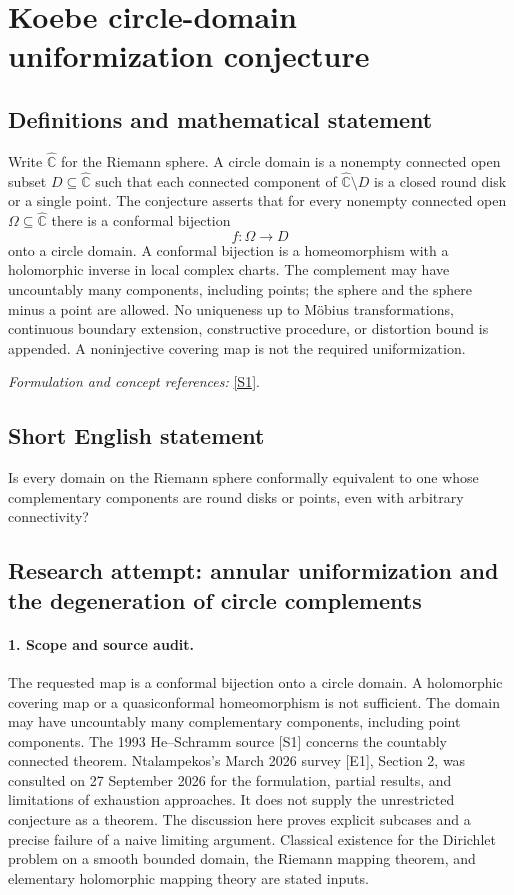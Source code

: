 \documentclass[11pt]{article}
\begin{document}
\section*{\texorpdfstring{Koebe circle-domain uniformization conjecture}{Koebe circle-domain uniformization conjecture}}\label{344}
\subsection{Definitions and mathematical statement}
Write $\widehat{{\mathbb{C}}}$ for the Riemann sphere. A circle domain is a nonempty connected open subset $D\subseteq\widehat{{\mathbb{C}}}$ such that each connected component of $\widehat{{\mathbb{C}}}\setminus D$ is a closed round disk or a single point. The conjecture asserts that for every nonempty connected open $\Omega\subseteq\widehat{{\mathbb{C}}}$ there is a conformal bijection
\[
 f:\Omega\longrightarrow D
\]
onto a circle domain. A conformal bijection is a homeomorphism with a holomorphic inverse in local complex charts. The complement may have uncountably many components, including points; the sphere and the sphere minus a point are allowed. No uniqueness up to M\"obius transformations, continuous boundary extension, constructive procedure, or distortion bound is appended. A noninjective covering map is not the required uniformization.
\par\smallskip\textit{Formulation and concept references:} \href{https://www.math.stonybrook.edu/~bishop/classes/math536.S24/He_Schramm_1993.pdf}{[S1]}.

\subsection{Short English statement}
Is every domain on the Riemann sphere conformally equivalent to one whose complementary components are round disks or points, even with arbitrary connectivity?
\subsection{Research attempt: annular uniformization and the degeneration of circle complements}
\paragraph{1. Scope and source audit.}
The requested map is a conformal bijection onto a circle domain. A holomorphic covering map or a quasiconformal homeomorphism is not sufficient. The domain may have uncountably many complementary components, including point components. The 1993 He--Schramm source [S1] concerns the countably connected theorem. Ntalampekos's March 2026 survey [E1], Section 2, was consulted on 27 September 2026 for the formulation, partial results, and limitations of exhaustion approaches. It does not supply the unrestricted conjecture as a theorem. The discussion here proves explicit subcases and a precise failure of a naive limiting argument. Classical existence for the Dirichlet problem on a smooth bounded domain, the Riemann mapping theorem, and elementary holomorphic mapping theory are stated inputs.
\end{document}
